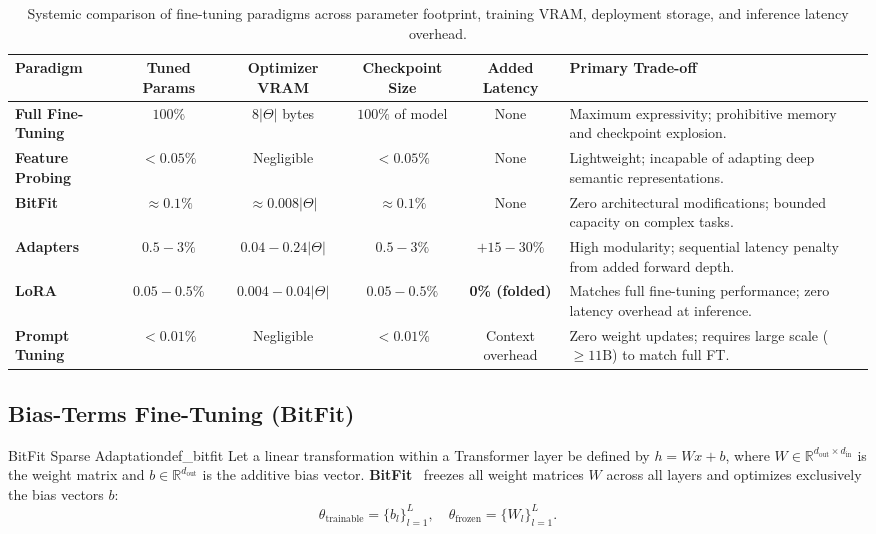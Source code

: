 \documentclass[../../../main.tex]{subfiles}
\begin{document}
\begin{table}[htbp]
\centering
\small
\caption{Systemic comparison of fine-tuning paradigms across parameter footprint, training VRAM, deployment storage, and inference latency overhead.}
\label{tab:peft_comparative_matrix}
\begin{tabularx}{\textwidth}{l c c c c X}
\toprule
\textbf{Paradigm} & \textbf{Tuned Params} & \textbf{Optimizer VRAM} & \textbf{Checkpoint Size} & \textbf{Added Latency} & \textbf{Primary Trade-off} \\
\midrule
\textbf{Full Fine-Tuning} 
    & $100\%$ & $8|\Theta|$ bytes & $100\%$ of model & None & Maximum expressivity; prohibitive memory and checkpoint explosion. \\
\addlinespace
\textbf{Feature Probing} 
    & $<0.05\%$ & Negligible & $<0.05\%$ & None & Lightweight; incapable of adapting deep semantic representations. \\
\addlinespace
\textbf{BitFit} 
    & $\approx 0.1\%$ & $\approx 0.008|\Theta|$ & $\approx 0.1\%$ & None & Zero architectural modifications; bounded capacity on complex tasks. \\
\addlinespace
\textbf{Adapters} 
    & $0.5 - 3\%$ & $0.04 - 0.24|\Theta|$ & $0.5 - 3\%$ & $+15 - 30\%$ & High modularity; sequential latency penalty from added forward depth. \\
\addlinespace
\textbf{LoRA} 
    & $0.05 - 0.5\%$ & $0.004 - 0.04|\Theta|$ & $0.05 - 0.5\%$ & \textbf{0\% (folded)} & Matches full fine-tuning performance; zero latency overhead at inference. \\
\addlinespace
\textbf{Prompt Tuning} 
    & $<0.01\%$ & Negligible & $<0.01\%$ & Context overhead & Zero weight updates; requires large scale ($\ge 11\text{B}$) to match full FT. \\
\bottomrule
\end{tabularx}
\end{table}

\subsection{Bias-Terms Fine-Tuning (BitFit)}
\label{subsec:bitfit_bias_tuning}

\begin{definition}{BitFit Sparse Adaptation}{def_bitfit}
Let a linear transformation within a Transformer layer be defined by $h = W x + b$, where $W \in \mathbb{R}^{d_{\text{out}} \times d_{\text{in}}}$ is the weight matrix and $b \in \mathbb{R}^{d_{\text{out}}}$ is the additive bias vector. \textbf{BitFit}~\citep{zaken2021bitfit} freezes all weight matrices $W$ across all layers and optimizes exclusively the bias vectors $b$:
\begin{equation}
\label{eq:bitfit_formulation}
\theta_{\text{trainable}} = \{b_l\}_{l=1}^L, \quad \theta_{\text{frozen}} = \{W_l\}_{l=1}^L.
\end{equation}
\end{definition}
\end{document}
